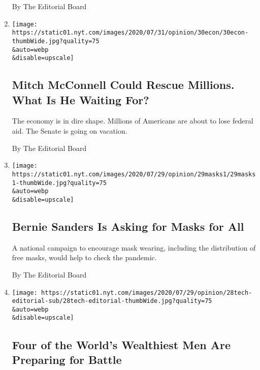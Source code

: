 \begin{enumerate}
  By The Editorial Board
\item
  \href{/2020/07/30/opinion/mitch-mcconnell-coronavirus-economy.html}{}

  \texttt{[image: https://static01.nyt.com/images/2020/07/31/opinion/30econ/30econ-thumbWide.jpg?quality=75\\\&auto=webp\\\&disable=upscale]}

  \hypertarget{mitch-mcconnell-could-rescue-millions-what-is-he-waiting-for}{%
  \subsection{Mitch McConnell Could Rescue Millions. What Is He Waiting
  For?}\label{mitch-mcconnell-could-rescue-millions-what-is-he-waiting-for}}

  The economy is in dire shape. Millions of Americans are about to lose
  federal aid. The Senate is going on vacation.

  By The Editorial Board
\item
  \href{/2020/07/29/opinion/us-coronavirus-masks.html}{}

  \texttt{[image: https://static01.nyt.com/images/2020/07/29/opinion/29masks1/29masks1-thumbWide.jpg?quality=75\\\&auto=webp\\\&disable=upscale]}

  \hypertarget{bernie-sanders-is-asking-for-masks-for-all}{%
  \subsection{Bernie Sanders Is Asking for Masks for
  All}\label{bernie-sanders-is-asking-for-masks-for-all}}

  A national campaign to encourage mask wearing, including the
  distribution of free masks, would help to check the pandemic.

  By The Editorial Board
\item
  \href{/2020/07/28/opinion/tech-ceo-hearing-congress.html}{}

  \texttt{[image: https://static01.nyt.com/images/2020/07/29/opinion/28tech-editorial-sub/28tech-editorial-thumbWide.jpg?quality=75\\\&auto=webp\\\&disable=upscale]}

  \hypertarget{four-of-the-worlds-wealthiest-men-are-preparing-for-battle}{%
  \subsection{Four of the World's Wealthiest Men Are Preparing for
  Battle}\label{four-of-the-worlds-wealthiest-men-are-preparing-for-battle}}


\end{enumerate}
